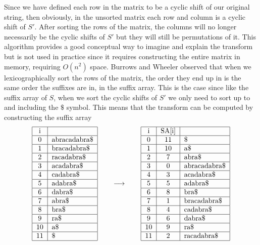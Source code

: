 \documentclass{article}
\begin{document}
Since we have defined each row in the matrix to be a cyclic shift of our original string, then obviously, in the unsorted matrix each row and column is a cyclic shift of \(S'\). After sorting the rows of the matrix, the columns will no longer necessarily be the cyclic shifts of \(S'\) but they will still be permutations of it. 
This algorithm provides a good conceptual way to imagine and explain the transform but is not used in practice since it requires constructing the entire matrix in memory, requiring \(O(n^2)\) space.
\newline
\newline
Burrows and Wheeler observed that when we lexicographically sort the rows of the matrix, the order they end up in is the same order the suffixes are in, in the suffix array. This is the case since like the suffix array of \(S\), when we sort the cyclic shifts of \(S'\) we only need to sort up to and including the \(\$\) symbol.
This means that the transform can be computed by constructing the suffix array
\begin{equation*}
    \begin{tabular}{|c|l|}
    \hline
    i & \\ \hline
    0 & abracadabra\$ \\ \hline
    1 & bracadabra\$ \\ \hline
    2 & racadabra\$ \\ \hline
    3 & acadabra\$ \\ \hline
    4 & cadabra\$ \\ \hline
    5 & adabra\$ \\ \hline
    6 & dabra\$ \\ \hline
    7 & abra\$ \\ \hline
    8 & bra\$ \\ \hline
    9 & ra\$ \\ \hline
    10 & a\$ \\ \hline
    11 &\$ \\ \hline
    \end{tabular}
    \qquad\longrightarrow\qquad
    \begin{tabular}{|c|c|l|}
    \hline
    i & SA[i] & \\ \hline
    0 & 11 &\$ \\ \hline
    1 & 10 & a\$ \\ \hline
    2 & 7 & abra\$ \\ \hline
    3 & 0 & abracadabra\$ \\ \hline
    4 & 3 & acadabra\$ \\ \hline
    5 & 5 & adabra\$ \\ \hline
    
    6 & 8 & bra\$ \\ \hline
    7 & 1 & bracadabra\$ \\ \hline
    8 & 4 & cadabra\$ \\ \hline
    
    9 & 6 & dabra\$ \\ \hline
    10 & 9 & ra\$ \\ \hline
    11 & 2 & racadabra\$ \\ \hline
    \end{tabular}
\end{equation*}
\end{document}
